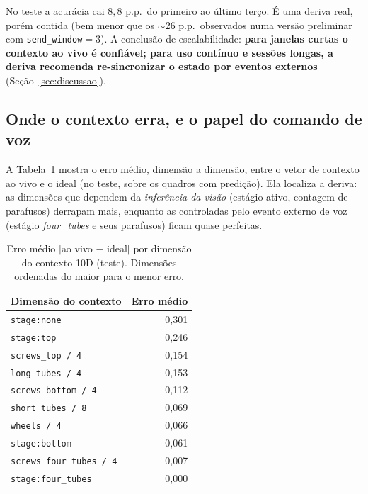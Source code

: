 \documentclass[11pt]{article}
\begin{document}
No teste a acurácia cai $8{,}8$ p.p.\ do primeiro ao último terço. É uma deriva
real, porém contida (bem menor que os $\sim$26 p.p.\ observados numa versão
preliminar com \texttt{send\_window}$=3$). A conclusão de escalabilidade:
\textbf{para janelas curtas o contexto ao vivo é confiável; para uso contínuo e
sessões longas, a deriva recomenda re-sincronizar o estado por eventos externos}
(Seção~\ref{sec:discussao}).

\subsection{Onde o contexto erra, e o papel do comando de voz}
\label{sec:onde-erra}

A Tabela~\ref{tab:dim} mostra o erro médio, dimensão a dimensão, entre o vetor de
contexto ao vivo e o ideal (no teste, sobre os quadros com predição). Ela
localiza a deriva: as dimensões que dependem da \emph{inferência da visão}
(estágio ativo, contagem de parafusos) derrapam mais, enquanto as controladas
pelo evento externo de voz (estágio \emph{four\_tubes} e seus parafusos) ficam
quase perfeitas.

\begin{table}[h]
\centering
\caption{Erro médio $|$ao vivo $-$ ideal$|$ por dimensão do contexto 10D (teste).
Dimensões ordenadas do maior para o menor erro.}
\label{tab:dim}
\begin{tabular}{lr}
\toprule
Dimensão do contexto & Erro médio \\
\midrule
\texttt{stage:none}          & 0,301 \\
\texttt{stage:top}           & 0,246 \\
\texttt{screws\_top / 4}     & 0,154 \\
\texttt{long tubes / 4}      & 0,153 \\
\texttt{screws\_bottom / 4}  & 0,112 \\
\texttt{short tubes / 8}     & 0,069 \\
\texttt{wheels / 4}          & 0,066 \\
\texttt{stage:bottom}        & 0,061 \\
\texttt{screws\_four\_tubes / 4} & 0,007 \\
\texttt{stage:four\_tubes}   & 0,000 \\
\bottomrule
\end{tabular}
\end{table}
\end{document}
